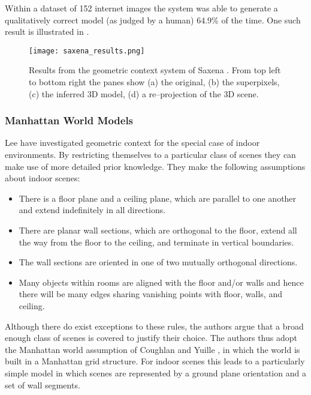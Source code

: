 Within a dataset of 152 internet images the system was able to
generate a qualitatively correct model (as judged by a human) 64.9\%
of the time. One such result is illustrated in .

\begin{figure}[htp]
\centering
\texttt{[image: saxena\_results.png]}
\caption{Results from the geometric context system of Saxena \etal
  \cite{Saxena09}. From top left to bottom right the panes show (a)
  the original, (b) the superpixels, (c) the inferred 3D model, (d) a
  re--projection of the 3D scene.}
\label{fig:saxena-result}
\end{figure}

\subsubsection{Manhattan World Models}

Lee \etal \cite{Lee09} have investigated geometric context for the
special case of indoor environments. By restricting themselves to a
particular class of scenes they can make use of more detailed prior
knowledge. They make the following assumptions about indoor scenes:
\begin{itemize}
  \item{There is a floor plane and a ceiling plane, which are parallel
    to one another and extend indefinitely in all directions.}
  \item{There are planar wall sections, which are orthogonal to the
    floor, extend all the way from the floor to the ceiling, and
    terminate in vertical boundaries.}
  \item{The wall sections are oriented in one of two mutually
    orthogonal directions.}
  \item{Many objects within rooms are aligned with the floor and/or
    walls and hence there will be many edges sharing vanishing points
    with floor, walls, and ceiling.}
\end{itemize}

Although there do exist exceptions to these rules, the authors argue
that a broad enough class of scenes is covered to justify their
choice. The authors thus adopt the Manhattan world assumption of
Coughlan and Yuille \cite{Coughlan99}, in which the world is built in a
Manhattan grid structure. For indoor scenes this leads to a
particularly simple model in which scenes are represented by a ground
plane orientation and a set of wall segments.

